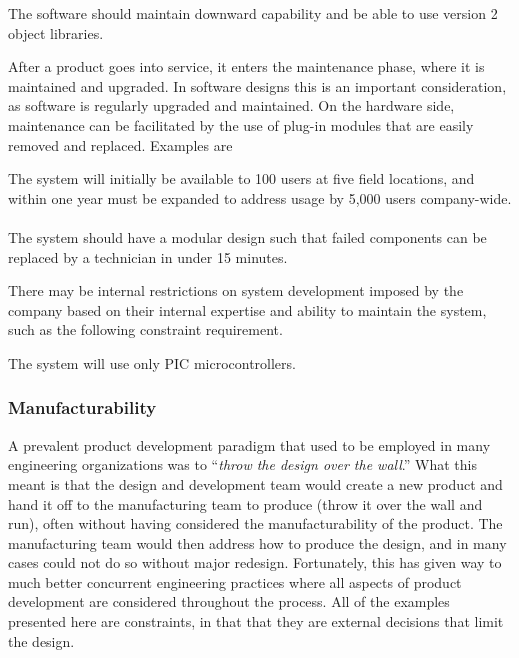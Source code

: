 \begin{itquote}
The software should maintain downward capability and be able to use
version 2 object libraries.
\end{itquote}

After a product goes into service, it enters the maintenance phase,
where it is maintained and upgraded. In software designs this is an
important consideration, as software is regularly upgraded and
maintained. On the hardware side, maintenance can be facilitated by the
use of plug-in modules that are easily removed and replaced. Examples
are

\begin{itquote}
The system will initially be available to 100 users at five field
locations, and within one year must be expanded to address usage by
5,000 users company-wide.\\ \\
The system should have a modular design such that failed components can
be replaced by a technician in under 15 minutes.
\end{itquote}

There may be internal restrictions on system development imposed by the
company based on their internal expertise and ability to maintain the
system, such as the following constraint requirement.

\begin{itquote}
The system will use only PIC microcontrollers.
\end{itquote}

\subsubsection*{Manufacturability}
\label{subsection:manufacturability}

A prevalent product development paradigm that used to be employed in
many engineering organizations was to ``\emph{throw the design over the
wall}.'' What this meant is that the design and development team would
create a new product and hand it off to the manufacturing team to
produce (throw it over the wall and run), often without having
considered the manufacturability of the product. The manufacturing team
would then address how to produce the design, and in many cases could
not do so without major redesign. Fortunately, this has given way to
much better concurrent engineering practices where all aspects of
product development are considered throughout the process. All of the
examples presented here are constraints, in that that they are external
decisions that limit the design.

